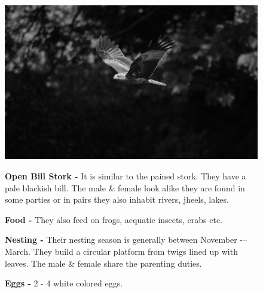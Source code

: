 \begin{figure}[H]
\begin{center}
\includegraphics{figure/Land_birds/01_pariah_kite/pariah-kite.eps}
\end{center}
\medskip
\noindent
{\bf Open Bill Stork -} It is similar to the pained stork. They have a pale blackish bill. The male \& female look alike they are found in some parties or in pairs they also inhabit rivers, jheels, lakes.

\medskip
{\bf Food -} They also feed on frogs, acquatie insects, crabs etc.

{\bf Nesting -} Their nesting season is generally between November -– March. They build a circular platform from twigs lined up with leaves. The male \& female share the parenting duties. 

{\bf Eggs -} 2 - 4 white colored eggs.
\end{figure}

\vfill\eject

~\phantom{a}
\vfill

